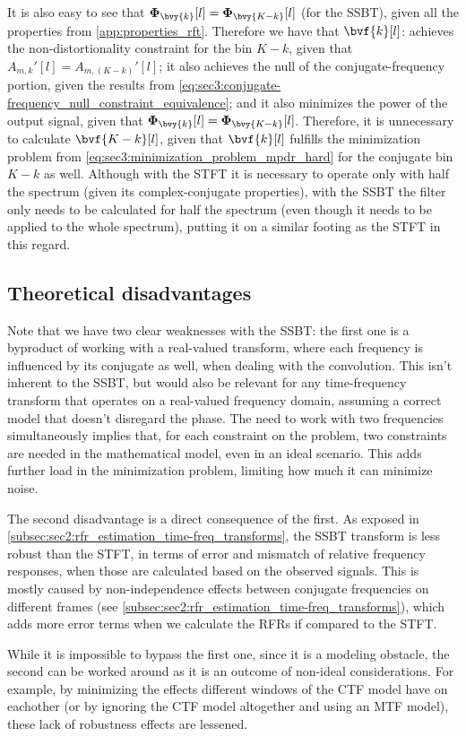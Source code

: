It is also easy to see that $\Corr{\bvy{k}}[l] = \Corr{\bvy{K-k}}[l]$ (for the SSBT), given all the properties from \cref{app:properties_rft}. Therefore we have that $\bvf{k}[l]$: achieves the non-distortionality constraint for the bin $K-k$, given that $A_{m,k}'[l] = A_{m,(K-k)}'[l]$; it also achieves the null of the conjugate-frequency portion, given the results from \cref{eq:sec3:conjugate-frequency_null_constraint_equivalence}; and it also minimizes the power of the output signal, given that $\Corr{\bvy{k}}[l] = \Corr{\bvy{K-k}}[l]$. Therefore, it is unnecessary to calculate $\bvf{K-k}[l]$, given that $\bvf{k}[l]$ fulfills the minimization problem from \cref{eq:sec3:minimization_problem_mpdr_hard} for the conjugate bin $K-k$ as well. Although with the STFT it is necessary to operate only with half the spectrum (given its complex-conjugate properties), with the SSBT the filter only needs to be calculated for half the spectrum (even though it needs to be applied to the whole spectrum), putting it on a similar footing as the STFT in this regard.

\subsection{Theoretical disadvantages}

Note that we have two clear weaknesses with the SSBT: the first one is a byproduct of working with a real-valued transform, where each frequency is influenced by its conjugate as well, when dealing with the convolution. This isn't inherent to the SSBT, but would also be relevant for any time-frequency transform that operates on a real-valued frequency domain, assuming a correct model that doesn't disregard the phase. The need to work with two frequencies simultaneously implies that, for each constraint on the problem, two constraints are needed in the mathematical model, even in an ideal scenario. This adds further load in the minimization problem, limiting how much it can minimize noise.

The second disadvantage is a direct consequence of the first. As exposed in \cref{subsec:sec2:rfr_estimation_time-freq_transforms}, the SSBT transform is less robust than the STFT, in terms of error and mismatch of relative frequency responses, when those are calculated based on the observed signals. This is mostly caused by non-independence effects between conjugate frequencies on different frames (see \cref{subsec:sec2:rfr_estimation_time-freq_transforms}), which adds more error terms when we calculate the RFRs if compared to the STFT.

While it is impossible to bypass the first one, since it is a modeling obstacle, the second can be worked around as it is an outcome of non-ideal considerations. For example, by minimizing the effects different windows of the CTF model have on eachother (or by ignoring the CTF model altogether and using an MTF model), these lack of robustness effects are lessened.
